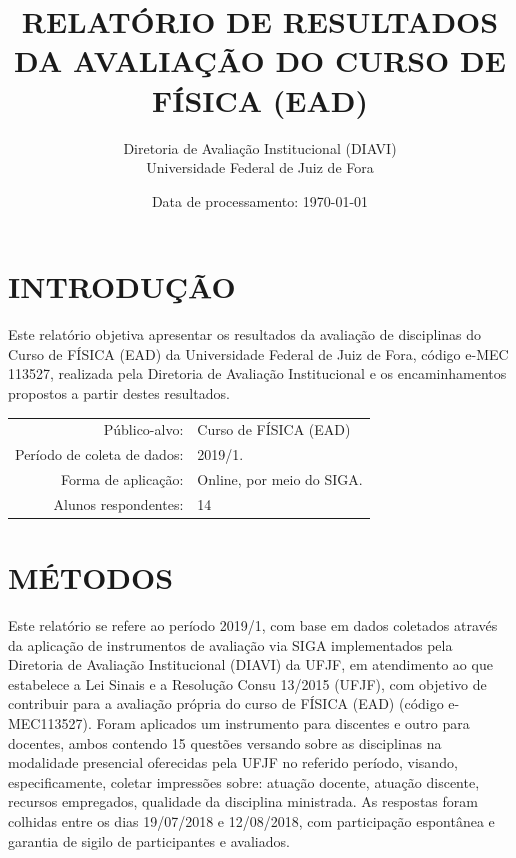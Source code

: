 \documentclass[a4paper,10pt]{article}
\date{Data de processamento: \today}
\begin{document}
\author{Diretoria de Avaliação Institucional (DIAVI) \\ Universidade Federal de Juiz de Fora}

\title{RELATÓRIO DE RESULTADOS DA AVALIAÇÃO DO CURSO DE FÍSICA (EAD)}
\maketitle
\section{INTRODUÇÃO}
Este relatório objetiva apresentar os resultados da avaliação de disciplinas do Curso     de FÍSICA (EAD) da Universidade Federal de Juiz de Fora, código e-MEC 113527, realizada pela     Diretoria de Avaliação Institucional e os encaminhamentos propostos a     partir destes resultados.

\begin{center}
\begin{tabularx}{\linewidth}{r|X}

Público-alvo:& Curso de FÍSICA (EAD)\\

Período de coleta de dados:& 2019/1.\\

Forma de aplicação:& Online, por meio do SIGA.\\

Alunos respondentes:& 14\\
\end{tabularx}
\end{center}

\section{MÉTODOS}
Este relatório se refere ao período 2019/1, com base em dados     coletados através da aplicação de instrumentos de avaliação via SIGA     implementados pela Diretoria de Avaliação Institucional (DIAVI) da UFJF, em atendimento     ao que estabelece a Lei Sinais e a Resolução Consu 13/2015 (UFJF),     com objetivo de contribuir para a avaliação própria do curso de FÍSICA (EAD) (código e-MEC113527). Foram aplicados um instrumento para discentes e outro para docentes, ambos contendo     15 questões versando sobre as disciplinas na modalidade presencial oferecidas pela UFJF no     referido período, visando, especificamente, coletar impressões sobre: atuação docente, atuação discente,     recursos empregados, qualidade da disciplina ministrada.     As respostas foram colhidas entre os dias 19/07/2018 e 12/08/2018, com participação espontânea e garantia de    sigilo de participantes e avaliados.
\end{document}
